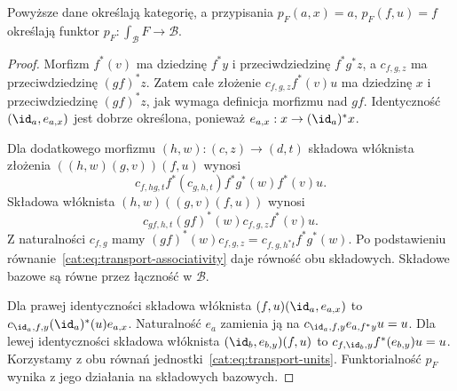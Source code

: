 \begin{stwierdzenie}\label{cat:prop:grothendieck-category}
Powyższe dane określają kategorię, a przypisania $p_F(a,x)=a$, $p_F(f,u)=f$ określają funktor $p_F:\int_{\mathcal B}F\to\mathcal B$.
\end{stwierdzenie}
\begin{proof}
Morfizm $f^*(v)$ ma dziedzinę $f^*y$ i przeciwdziedzinę $f^*g^*z$, a $c_{f,g,z}$ ma przeciwdziedzinę $(gf)^*z$. Zatem całe złożenie $c_{f,g,z}f^*(v)u$ ma dziedzinę $x$ i przeciwdziedzinę $(gf)^*z$, jak wymaga definicja morfizmu nad $gf$. Identyczność $(\id_a,e_{a,x})$ jest dobrze określona, ponieważ $e_{a,x}:x\to(\id_a)^*x$.

Dla dodatkowego morfizmu $(h,w):(c,z)\to(d,t)$ składowa włóknista złożenia $((h,w)(g,v))(f,u)$ wynosi
\[
 c_{f,hg,t}f^*(c_{g,h,t})f^*g^*(w)f^*(v)u.
\]
Składowa włóknista $(h,w)((g,v)(f,u))$ wynosi
\[
 c_{gf,h,t}(gf)^*(w)c_{f,g,z}f^*(v)u.
\]
Z naturalności $c_{f,g}$ mamy
$(gf)^*(w)c_{f,g,z}=c_{f,g,h^*t}f^*g^*(w)$.
Po podstawieniu równanie~\eqref{cat:eq:transport-associativity} daje równość obu składowych. Składowe bazowe są równe przez łączność w $\mathcal B$.

Dla prawej identyczności składowa włóknista $(f,u)(\id_a,e_{a,x})$ to
$c_{\id_a,f,y}(\id_a)^*(u)e_{a,x}$.
Naturalność $e_a$ zamienia ją na $c_{\id_a,f,y}e_{a,f^*y}u=u$. Dla lewej identyczności składowa włóknista $(\id_b,e_{b,y})(f,u)$ to
$c_{f,\id_b,y}f^*(e_{b,y})u=u$.
Korzystamy z obu równań jednostki~\eqref{cat:eq:transport-units}. Funktorialność $p_F$ wynika z jego działania na składowych bazowych.
\end{proof}

